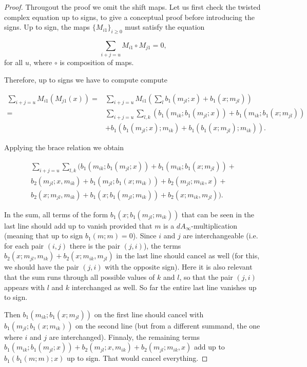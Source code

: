 \documentclass[Thesis.tex]{subfiles}
\begin{document}
\begin{proof}


Througout the proof we omit the shift maps. Let us first check the twisted complex equation up to signs, to give a conceptual proof before introducing the signs. Up to sign, the maps  $\{M_{i1}\}_{i\geq 0}$ must satisfy the equation

\[\sum_{i+j=u} M_{i1}\circ M_{j1}=0,\]
for all $u$, where $\circ$ is composition of maps. %

Therefore, up to signs we have to compute compute 

\begin{align*}
\sum_{i+j=u}M_{i1}(M_{j1}(x))=&\sum_{i+j=u}M_{i1}\left(\sum_l b_1(m_{jl};x)+b_1(x;m_{jl})\right)\\
=&\sum_{i+j=u}\sum_{l,k}\left(b_1(m_{ik}; b_1(m_{jl};x))+b_1(m_{ik};b_1(x;m_{jl}))\right.\\
&\left.+b_1(b_1(m_{jl};x);m_{ik})+b_1(b_1(x;m_{jl});m_{ik})\right).
\end{align*}



Applying the brace relation we obtain

\begin{align*}
\sum_{i+j=u}\sum_{l,k}(b_1(m_{ik}; b_1(m_{jl};x))+b_1(m_{ik};b_1(x;m_{jl}))+\\
 b_2(m_{jl};x,m_{ik})+b_1(m_{jl};b_1(x;m_{ik}))+b_2(m_{jl};m_{ik},x)+\\
b_2(x;m_{jl},m_{ik})+b_1(x;b_1(m_{jl};m_{ik}))+b_2(x;m_{ik},m_{jl})).
\end{align*}

In the sum, all terms of the form $b_1(x;b_1(m_{jl};m_{ik}))$ that can be seen in the last line should add up to vanish provided that $m$ is a $dA_\infty$-multiplication (meaning that up to sign $b_1(m;m)=0$). %
 Since $i$ and $j$ are interchangeable (i.e. for each pair $(i,j)$ there is the pair $(j,i)$), the terms $b_2(x;m_{jl},m_{ik})+b_2(x;m_{ik},m_{jl})$ in the last line should cancel as well (for this, we should have the pair $(j,i)$ with the opposite sign). Here it is also relevant that the sum runs through all possible values of $k$ and $l$, so that the pair $(j,i)$ appears with $l$ and $k$ interchanged as well. So far the entire last line vanishes up to sign.

Then $b_1(m_{ik};b_1(x;m_{jl}))$ on the first line should cancel with $b_1(m_{jl};b_1(x;m_{ik}))$ on the second line (but from a different summand, the one where $i$ and $j$ are interchanged). Finnaly, the remaining terms $b_1(m_{ik}; b_1(m_{jl};x))+b_2(m_{jl};x,m_{ik})+b_2(m_{jl};m_{ik},x)$ add up to $b_1(b_1(m;m);x)$ up to sign. That would cancel everything.


\end{proof}
\end{document}

